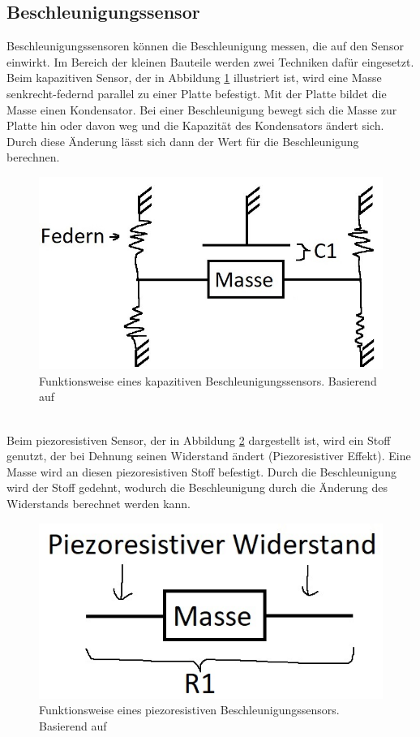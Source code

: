 \subsection{Beschleunigungssensor}
Beschleunigungssensoren können die Beschleunigung messen, die auf den Sensor einwirkt.
Im Bereich der kleinen Bauteile werden zwei Techniken dafür eingesetzt.\\
Beim kapazitiven Sensor, der in Abbildung \ref{fig:pic_accel_kapa} illustriert ist, wird eine Masse senkrecht-federnd parallel zu einer Platte befestigt.
Mit der Platte bildet die Masse einen Kondensator.
Bei einer Beschleunigung bewegt sich die Masse zur Platte hin oder davon weg und die Kapazität des Kondensators ändert sich.
Durch diese Änderung lässt sich dann der Wert für die Beschleunigung berechnen. \cite{site_mems}
\begin{figure}[hbtp]
	\centering
	\includegraphics[width=0.33\linewidth]{res/kinAccel.jpg}
	\caption{Funktionsweise eines kapazitiven Beschleunigungssensors. Basierend auf \cite{site_sensorbild}}
	\label{fig:pic_accel_kapa}
\end{figure}\\
Beim piezoresistiven Sensor, der in Abbildung \ref{fig:pic_accel_pie} dargestellt ist, wird ein Stoff genutzt, der bei Dehnung seinen Widerstand ändert (Piezoresistiver Effekt).
Eine Masse wird an diesen piezoresistiven Stoff befestigt.
Durch die Beschleunigung wird der Stoff gedehnt, wodurch die Beschleunigung durch die Änderung des Widerstands berechnet werden kann. \cite{site_dms}
\begin{figure}[hbtp]
	\centering
	\includegraphics[width=0.25\linewidth]{res/prAccel.jpg}
	\caption{Funktionsweise eines piezoresistiven Beschleunigungssensors. Basierend auf \cite{site_sensorbild}}
	\label{fig:pic_accel_pie}
\end{figure}

